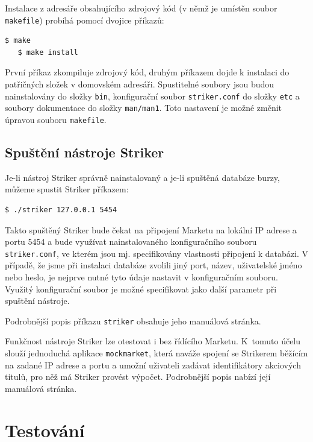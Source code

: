 \documentclass[thesis=M,czech]{FITthesis}[2012/06/26]
\begin{document}
Instalace z adresáře obsahujícího zdrojový kód (v němž je umístěn soubor \texttt{makefile}) probíhá pomocí dvojice příkazů:

\begin{lstlisting}[basicstyle={\small\ttfamily}] 
   $ make
   $ make install
\end{lstlisting}

První příkaz zkompiluje zdrojový kód, druhým příkazem dojde k instalaci do patřičných složek v domovském adresáři.  
Spustitelné soubory jsou budou nainstalovány do složky \texttt{bin}, konfigurační soubor \texttt{striker.conf} do
složky \texttt{etc} a soubory dokumentace do složky \texttt{man/man1}. Toto nastavení je možné změnit úpravou 
souboru \texttt{makefile}.

\section{Spuštění nástroje Striker}

Je-li nástroj Striker správně nainstalovaný a je-li spuštěná databáze burzy, můžeme spustit Striker příkazem:

\begin{lstlisting}[basicstyle={\small\ttfamily}] 
   $ ./striker 127.0.0.1 5454
\end{lstlisting}

Takto spuštěný Striker bude čekat na připojení Marketu na lokální IP adrese a portu 5454 a bude využívat nainstalovaného 
konfiguračního souboru \texttt{striker.conf}, ve kterém jsou mj. specifikovány vlastnosti připojení k databázi. V případě, 
že jsme při instalaci databáze zvolili jiný port, název, uživatelské jméno nebo heslo, je nejprve nutné tyto údaje nastavit 
v konfiguračním souboru. Využitý konfigurační soubor je možné specifikovat jako další parametr při spuštění nástroje. 

Podrobnější popis příkazu \texttt{striker} obsahuje jeho manuálová stránka.

Funkčnost nástroje Striker lze otestovat i bez řídícího Marketu. K~tomuto účelu slouží jednoduchá aplikace \texttt{mockmarket}, 
která naváže spojení se Strikerem běžícím na zadané IP adrese a portu a umožní uživateli zadávat identifikátory akciových titulů, 
pro něž má Striker provést výpočet. Podrobnější popis nabízí její manuálová stránka.


\chapter{Testování}
\end{document}
